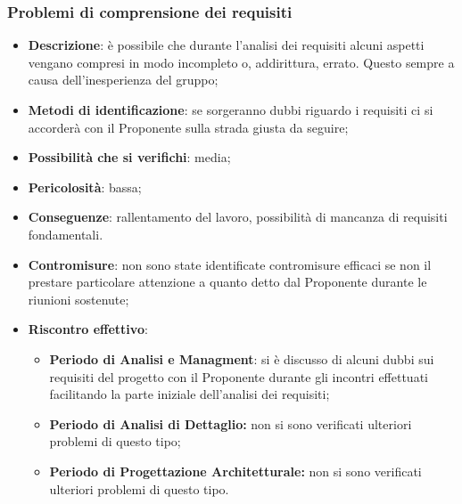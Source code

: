 		
		\subsubsection{Problemi di comprensione dei requisiti}
		\begin{itemize}
			\item \textbf{Descrizione}: è possibile che durante l'analisi dei requisiti alcuni aspetti vengano compresi in modo incompleto o, addirittura, errato. Questo sempre a causa dell'inesperienza del gruppo;
			\item \textbf{Metodi di identificazione}: se sorgeranno dubbi riguardo i requisiti ci si accorderà con il Proponente sulla strada giusta da seguire;
			\item \textbf{Possibilità che si verifichi}: media;
			\item \textbf{Pericolosità}: bassa;
			\item \textbf{Conseguenze}: rallentamento del lavoro, possibilità di mancanza di requisiti fondamentali. 
			\item \textbf{Contromisure}: non sono state identificate contromisure efficaci se non il prestare particolare attenzione a quanto detto dal Proponente durante le riunioni sostenute;
			\item \textbf{Riscontro effettivo}:
			\begin{itemize}
				\item \textbf{Periodo di Analisi e Managment}: si è discusso di alcuni dubbi sui requisiti del progetto con il Proponente durante gli incontri effettuati facilitando la parte iniziale dell'analisi dei requisiti;
				\item \textbf{Periodo di Analisi di Dettaglio:} non si sono verificati ulteriori problemi di questo tipo;
				\item \textbf{Periodo di Progettazione Architetturale:} non si sono verificati ulteriori problemi di questo tipo.
			\end{itemize}
		\end{itemize}
